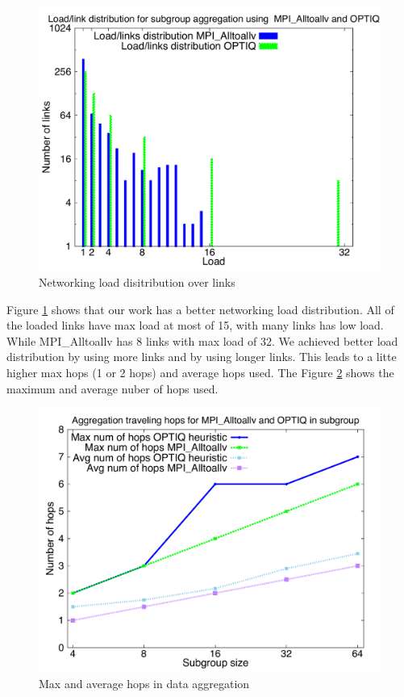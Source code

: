 \begin{figure}[!htb]
\vspace{-0.1in}
\centering
\includegraphics[scale=0.30]{figures/distribution.pdf}
\vspace{-0.1in}
\caption{Networking load disitribution over links}
\vspace{-0.1in}
\label{fig:aggdist}
\end{figure}

Figure \ref{fig:aggdist} shows that our work has a better networking load distribution. All of the loaded links have max load at most of 15, with many links has low load. While MPI\_Alltoallv has 8 links with max load of 32. We achieved better load distribution by using more links and by using longer links. This leads to a litte higher max hops (1 or 2 hops) and average hops used. The Figure \ref{fig:agghop} shows the maximum and average nuber of hops used.

\begin{figure}[!htb]
\vspace{-0.1in}
\centering
\includegraphics[scale=0.30]{figures/hop.pdf}
\vspace{-0.1in}
\caption{Max and average hops in data aggregation}
\vspace{-0.1in}
\label{fig:agghop}
\end{figure}

